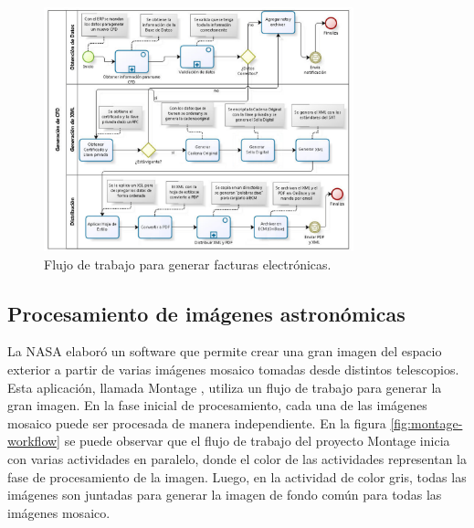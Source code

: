\begin{figure}
    \begin{center}
        \includegraphics[width=0.8\textwidth]{imagenes/cfd-workflow}
    \end{center}
    \caption{Flujo de trabajo para generar facturas electrónicas.}
    \label{fig:cfd-workflow}
\end{figure}

\subsection{Procesamiento de imágenes astronómicas}

La NASA elaboró un software que permite crear una gran imagen del espacio exterior a partir de varias imágenes mosaico tomadas desde distintos telescopios. Esta aplicación, llamada Montage \cite{jacob2009montage}, utiliza un flujo de trabajo para generar la gran imagen. En la fase inicial de procesamiento, cada una de las imágenes mosaico puede ser procesada de manera independiente. En la figura \ref{fig:montage-workflow} se puede observar que el flujo de trabajo del proyecto Montage inicia con varias actividades en paralelo, donde el color de las actividades representan la fase de procesamiento de la imagen. Luego, en la actividad de color gris, todas las imágenes son juntadas para generar la imagen de fondo común para todas las imágenes mosaico.

